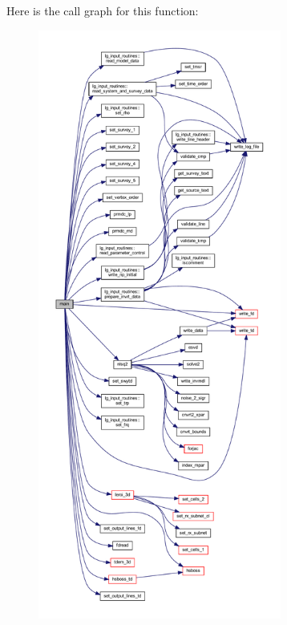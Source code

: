 Here is the call graph for this function\+:\nopagebreak
\begin{figure}[H]
\begin{center}
\leavevmode
\includegraphics[height=550pt]{Leroi__c_8f90_a8ec2266d83cd6c0b762cbcbc92c0af3d_cgraph}
\end{center}
\end{figure}
\mbox{\label{Leroi__c_8f90_a004c7d5d0aeff550ae33684b04654b48}} 
